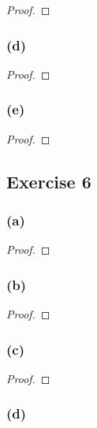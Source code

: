 \documentclass[14pt]{extarticle}
\begin{document}
\begin{proof}

\end{proof}

\subsubsection{(d)}

\begin{proof}

\end{proof}

\subsubsection{(e)}

\begin{proof}

\end{proof}

\subsection{Exercise 6}

\subsubsection{(a)}

\begin{proof}

\end{proof}

\subsubsection{(b)}

\begin{proof}

\end{proof}

\subsubsection{(c)}

\begin{proof}

\end{proof}

\subsubsection{(d)}
\end{document}

